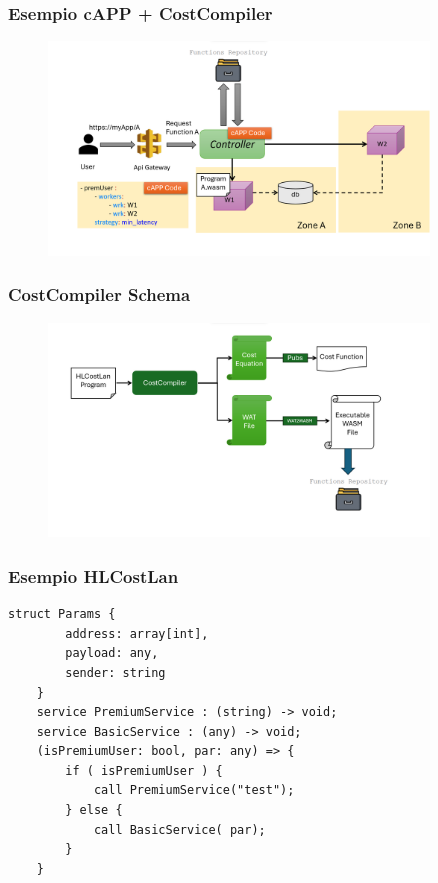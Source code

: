 \documentclass[xcolor=dvipsnames]{beamer}
\begin{document}
\begin{frame}
    \frametitle{Esempio cAPP + CostCompiler}
    \begin{figure}
        \centering
        \includegraphics[width=0.9\textwidth]{capp_schema_worker_sel.png}
    \end{figure}
\end{frame}
\begin{frame}
    \frametitle{CostCompiler Schema}
    \begin{figure}
        \centering
        \includegraphics[width=0.9\textwidth]{cost_compiler_schema.png}
    \end{figure}
\end{frame}
\begin{frame}[fragile]
    \frametitle{Esempio HLCostLan}
    \begin{lstlisting}[language=HLCostLan, caption={Esempio di funzione in HLCostLan}]
    struct Params {
        address: array[int],
        payload: any,
        sender: string
    }
    service PremiumService : (string) -> void;
    service BasicService : (any) -> void;
    (isPremiumUser: bool, par: any) => {
        if ( isPremiumUser ) {
            call PremiumService("test");
        } else {
            call BasicService( par);
        }
    }
    \end{lstlisting}
\end{frame}
\end{document}
